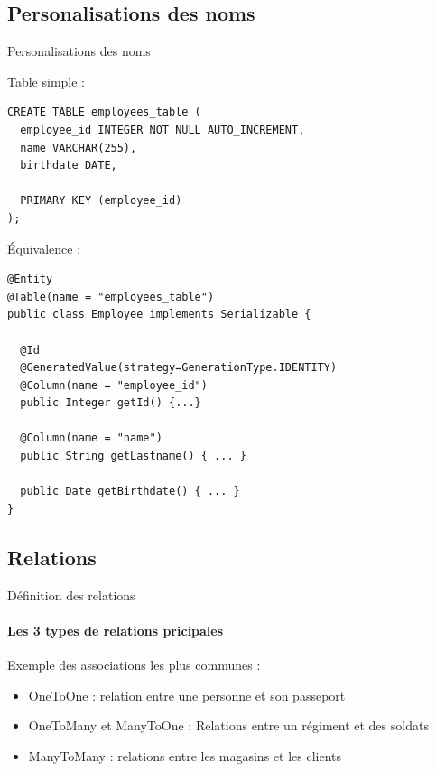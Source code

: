 \documentclass[compress]{beamer}%
\begin{document}
\subsection{Personalisations des noms}
\begin{frame}[fragile]{Personalisations des noms}

	
	Table simple : 
	\begin{lstlisting}
CREATE TABLE employees_table (
  employee_id INTEGER NOT NULL AUTO_INCREMENT,
  name VARCHAR(255),
  birthdate DATE,
  
  PRIMARY KEY (employee_id)
);
	\end{lstlisting}
	
	\pause
	\'Equivalence :
	\begin{lstlisting}
@Entity
@Table(name = "employees_table")
public class Employee implements Serializable {

  @Id
  @GeneratedValue(strategy=GenerationType.IDENTITY)
  @Column(name = "employee_id")
  public Integer getId() {...}
    
  @Column(name = "name")
  public String getLastname() { ... }
  
  public Date getBirthdate() { ... }
}
	\end{lstlisting}
	
\end{frame}


\subsection{Relations}

\begin{frame}{Définition des relations}
	\framesubtitle{Les 3 types de relations pricipales}
	
	Exemple des associations les plus communes :
	\begin{itemize}[<+->]
		\item OneToOne : relation entre une personne et son passeport
		\item OneToMany et ManyToOne : Relations entre un régiment et des soldats
		\item ManyToMany : relations entre les magasins et les clients
	\end{itemize}

\end{frame}
\end{document}
